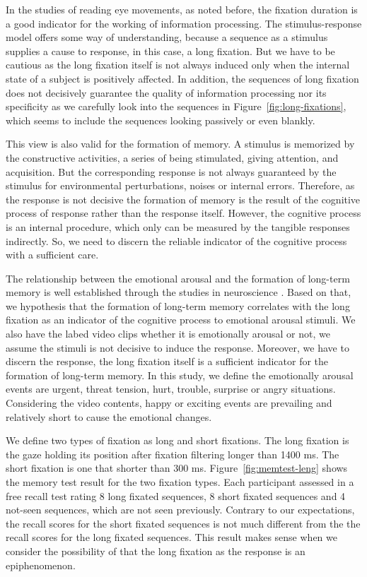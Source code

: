 \documentclass[10pt,letterpaper]{article}
\begin{document}
In the studies of reading eye movements, as noted before, the fixation duration is a good indicator for the working of information processing. The stimulus-response model offers some way of understanding, because a sequence as a stimulus supplies a cause to response, in this case, a long fixation. But we have to be cautious as the long fixation itself is not always induced only when the internal state of a subject is positively affected. In addition, the sequences of long fixation does not decisively guarantee the quality of information processing nor its specificity as we carefully look into the sequences in Figure~\ref{fig:long-fixations}, which seems to include the sequences looking passively or even blankly. 

This view is also valid for the formation of memory. A stimulus is memorized by the constructive activities, a series of being stimulated, giving attention, and acquisition. But the corresponding response is not always guaranteed by the stimulus for environmental perturbations, noises or internal errors. Therefore, as the response is not decisive the formation of memory is the result of the cognitive process of response rather than the response itself. However, the cognitive process is an internal procedure, which only can be measured by the tangible responses indirectly. So, we need to discern the reliable indicator of the cognitive process with a sufficient care. 

The relationship between the emotional arousal and the formation of long-term memory is well established through the studies in neuroscience \cite{Cahill1996amyg,Cahill1998baso}. Based on that, we hypothesis that the formation of long-term memory correlates with the long fixation as an indicator of the cognitive process to emotional arousal stimuli. We also have the labed video clips whether it is emotionally arousal or not, we assume the stimuli is not decisive to induce the response. Moreover, we have to discern the response, the long fixation itself is a sufficient indicator for the formation of long-term memory. In this study, we define the emotionally arousal events are urgent, threat
tension, hurt, trouble, surprise or angry situations. Considering the video contents, happy or exciting events are prevailing and relatively short to cause the emotional changes.

We define two types of fixation as long and short fixations. The long fixation is the gaze holding its position after fixation filtering longer than 1400 ms. The short fixation is one that shorter than 300 ms. Figure~\ref{fig:memtest-leng} shows the memory test result for the two fixation types. Each participant assessed in a free recall test rating 8 long fixated sequences, 8 short fixated sequences and 4 not-seen sequences, which are not seen previously. Contrary to our expectations, the recall scores for the short fixated sequences is not much different from the the recall scores for the long fixated sequences. This result makes sense when we consider the possibility of that the long fixation as the response is an epiphenomenon.
\end{document}
